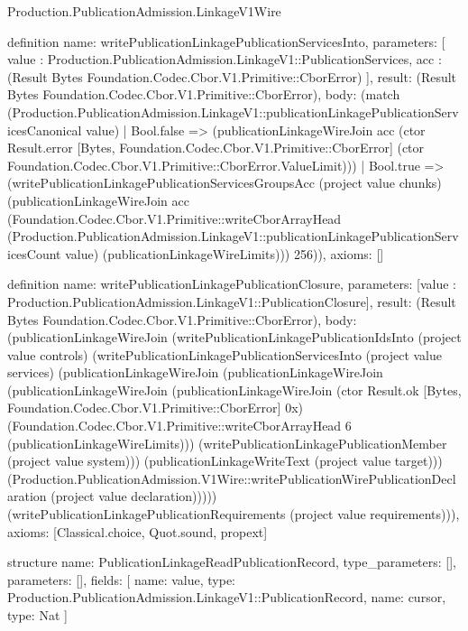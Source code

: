 \begin{lexlean}{Production.PublicationAdmission.LinkageV1Wire}
\begin{semanticmodule}
definition{
  name: writePublicationLinkagePublicationServicesInto,
  parameters: [
    value : Production.PublicationAdmission.LinkageV1::PublicationServices,
    acc : (Result Bytes Foundation.Codec.Cbor.V1.Primitive::CborError)
  ],
  result: (Result Bytes Foundation.Codec.Cbor.V1.Primitive::CborError),
  body: (match (Production.PublicationAdmission.LinkageV1::publicationLinkagePublicationServicesCanonical value)
    | Bool.false => (publicationLinkageWireJoin acc (ctor Result.error [Bytes, Foundation.Codec.Cbor.V1.Primitive::CborError] (ctor Foundation.Codec.Cbor.V1.Primitive::CborError.ValueLimit)))
    | Bool.true => (writePublicationLinkagePublicationServicesGroupsAcc (project value chunks) (publicationLinkageWireJoin acc (Foundation.Codec.Cbor.V1.Primitive::writeCborArrayHead (Production.PublicationAdmission.LinkageV1::publicationLinkagePublicationServicesCount value) (publicationLinkageWireLimits))) 256)),
  axioms: []
}

definition{
  name: writePublicationLinkagePublicationClosure,
  parameters: [value : Production.PublicationAdmission.LinkageV1::PublicationClosure],
  result: (Result Bytes Foundation.Codec.Cbor.V1.Primitive::CborError),
  body: (publicationLinkageWireJoin (writePublicationLinkagePublicationIdsInto (project value controls) (writePublicationLinkagePublicationServicesInto (project value services) (publicationLinkageWireJoin (publicationLinkageWireJoin (publicationLinkageWireJoin (publicationLinkageWireJoin (ctor Result.ok [Bytes, Foundation.Codec.Cbor.V1.Primitive::CborError] 0x) (Foundation.Codec.Cbor.V1.Primitive::writeCborArrayHead 6 (publicationLinkageWireLimits))) (writePublicationLinkagePublicationMember (project value system))) (publicationLinkageWriteText (project value target))) (Production.PublicationAdmission.V1Wire::writePublicationWirePublicationDeclaration (project value declaration))))) (writePublicationLinkagePublicationRequirements (project value requirements))),
  axioms: [Classical.choice, Quot.sound, propext]
}

structure{
  name: PublicationLinkageReadPublicationRecord,
  type_parameters: [],
  parameters: [],
  fields: [
    {name: value, type: Production.PublicationAdmission.LinkageV1::PublicationRecord},
    {name: cursor, type: Nat}
  ]
}


\end{semanticmodule}
\end{lexlean}
